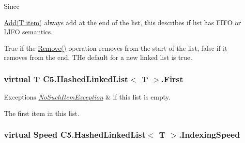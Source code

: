 Since 

{\ttfamily \hyperlink{class_c5_1_1_hashed_linked_list_afcfc7b8da2f00ad7d8e3decadadd74bc}{Add(\+T item)}} always add at the end of the list, this describes if list has F\+I\+F\+O or L\+I\+F\+O semantics. 

True if the {\ttfamily \hyperlink{class_c5_1_1_hashed_linked_list_a899849bf8ad50e60206c8b3b59611eaf}{Remove()}} operation removes from the start of the list, false if it removes from the end. T\+He default for a new linked list is true.\hypertarget{class_c5_1_1_hashed_linked_list_a364ea12660521152709ecb6ea0ff231d}{}
\subsubsection[{First}]{\setlength{\rightskip}{0pt plus 5cm}virtual T {\bf C5.\+Hashed\+Linked\+List}$<$ T $>$.First\hspace{0.3cm}{\ttfamily [get]}}\label{class_c5_1_1_hashed_linked_list_a364ea12660521152709ecb6ea0ff231d}





\begin{DoxyExceptions}{Exceptions}
{\em \hyperlink{class_c5_1_1_no_such_item_exception}{No\+Such\+Item\+Exception}} & if this list is empty.\\
\hline
\end{DoxyExceptions}


The first item in this list.\hypertarget{class_c5_1_1_hashed_linked_list_aa72a5381efc4af4311dabc4b1b214ec4}{}
\subsubsection[{Indexing\+Speed}]{\setlength{\rightskip}{0pt plus 5cm}virtual {\bf Speed} {\bf C5.\+Hashed\+Linked\+List}$<$ T $>$.Indexing\+Speed\hspace{0.3cm}{\ttfamily [get]}}\label{class_c5_1_1_hashed_linked_list_aa72a5381efc4af4311dabc4b1b214ec4}




\hypertarget{class_c5_1_1_hashed_linked_list_ae5328883cfc6d4f3415635f4fd2fb0fc}{}
